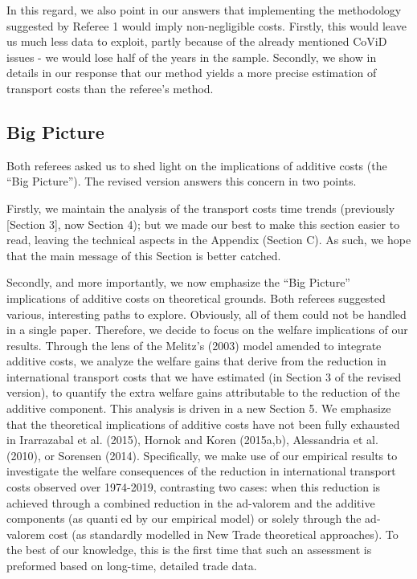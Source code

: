 \documentclass[12pt]{article}
\begin{document}
In this regard, we also point in our answers that implementing the methodology suggested by Referee 1 would imply non-negligible costs. Firstly, this would leave us much less data to exploit, partly  because of the already mentioned CoViD issues - we would lose half of the years in the sample. Secondly, we show in details in our response that our method yields a more precise estimation of transport costs than the referee's method. \medskip



\subsection{Big Picture}
Both referees asked us to shed light on the implications of additive costs (the ``Big Picture''). The revised version answers this concern in two points. \medskip

Firstly, we maintain the analysis of the transport costs time trends (previously [Section 3], now Section 4); but we made our best to make this section easier to read, leaving the technical aspects in the Appendix (Section C). As such, we hope that the main message of this Section is better catched. \medskip

Secondly, and more importantly, we now emphasize the ``Big Picture'' implications of additive costs on theoretical grounds. Both referees suggested various, interesting paths to explore. Obviously, all of them could not be handled in a single paper. Therefore, we decide to focus on the welfare implications of our results.  Through the lens of the Melitz's (2003) model amended to integrate additive costs, we analyze the welfare gains that derive from the reduction in international transport costs that we have estimated (in Section 3 of the revised version), to quantify the extra welfare gains attributable to the reduction of the additive component. This analysis is driven in a new Section 5. We emphasize that the theoretical implications of additive costs have not been fully exhausted in Irarrazabal et al. (2015), Hornok and Koren (2015a,b), Alessandria et al. (2010), or Sorensen (2014). Specifically, we make use of our empirical results to investigate the welfare consequences of the reduction in international transport costs observed over 1974-2019, contrasting two cases: when this reduction is achieved through a combined reduction in the ad-valorem and the additive components (as quantied by our empirical model) or solely through the ad-valorem cost (as standardly modelled in New Trade theoretical approaches). To the best of our knowledge, this is the first time that such an assessment is preformed based on long-time, detailed trade data.
\medskip
\end{document}
